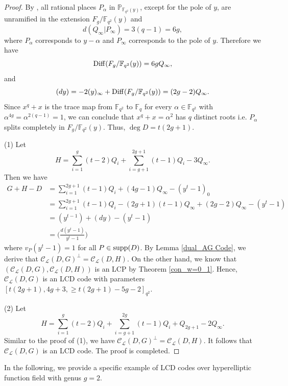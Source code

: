 \documentclass[journal,12pt,onecolumn]{IEEEtran}
\begin{document}
\begin{proof}
    By \cite[Prop. 3.7.10]{Algebraic_Function_Fields_and_Codes}, all rational places $P_\alpha$ in $\mathbb{P}_{\mathbb{F}_{q^2}(y)}$, except for the pole of $y$, are unramified in the extension $F_g/\mathbb{F}_{q^2}(y)$ and 
    \[
        d(Q_\infty|P_\infty) = 3(q-1) = 6g,
    \]
    where $P_\alpha$ corresponds to $y-\alpha$ and $P_\infty$ corresponds to the pole of $y$. Therefore we have
    \[
        {\rm Diff}(F_g/\mathbb{F}_{q^2}(y)) = 6g Q_\infty, 
    \]
    and 
    \[
        (dy) = -2(y)_\infty + {\rm Diff}(F_g/\mathbb{F}_{q^2}(y)) = (2g-2) Q_\infty.
    \]
    Since $x^q+x$ is the trace map from $\mathbb{F}_{q^2}$ to $\mathbb{F}_{q}$ for every $\alpha\in\mathbb{F}_{q^2}$ with $\alpha^{4g}=\alpha^{2(q-1)}=1$, we can conclude that $x^q+x = \alpha^2$ has $q$ distinct roots i.e. $P_\alpha$ splits completely in $F_g/\mathbb{F}_{q^2}(y)$. Thus, $\deg D = t(2g+1)$. 

    {\rm (1)} Let 
    \[
        H = \sum_{i=1}^g (t-2)Q_i + \sum_{i=g+1}^{2g+1} (t-1)Q_i - 3Q_\infty.
    \]
    Then we have
    \begin{align*}
        G+H-D & = \sum_{i=1}^{2g+1} (t-1)Q_i + (4g-1) Q_\infty - (y^t-1)_0 \\
        & = \sum_{i=1}^{2g+1} (t-1)Q_i - (2g+1)(t-1) Q_\infty + (2g-2)Q_\infty - (y^t-1)\\
        & = (y^{t-1}) + (dy) - (y^t-1)\\
        & = \bigg(\frac{d(y^t-1)}{y^t-1}\bigg)
    \end{align*}
    where $v_{P}(y^t-1)=1$ for all $P\in{\rm supp}(D)$. By Lemma \ref{dual_AG Code}, we derive that $\mathcal{C}_{\mathcal{L}}(D,G)^{\perp} = \mathcal{C}_{\mathcal{L}}(D,H)$. On the other hand, we know that $(\mathcal{C}_{\mathcal{L}}(D,G),\mathcal{C}_{\mathcal{L}}(D,H))$ is an LCP by Theorem \ref{con_w=0_1}. Hence, $\mathcal{C}_{\mathcal{L}}(D,G)$ is an LCD code with parameters $[t(2g+1),4g+3,\ge t(2g+1)-5g-2]_{q^2}$. 

    {\rm (2)} Let 
    \[
        H = \sum_{i=1}^g (t-2)Q_i + \sum_{i=g+1}^{2g} (t-1)Q_i + Q_{2g+1} - 2Q_\infty.
    \]
    Similar to the proof of (1), we have $\mathcal{C}_{\mathcal{L}}(D,G)^{\perp} = \mathcal{C}_{\mathcal{L}}(D,H)$. It follows that $\mathcal{C}_{\mathcal{L}}(D,G)$ is an LCD code. The proof is completed. 
\end{proof}

In the following, we provide a specific example of LCD codes over hyperelliptic function field with genus $g=2$.
\end{document}
